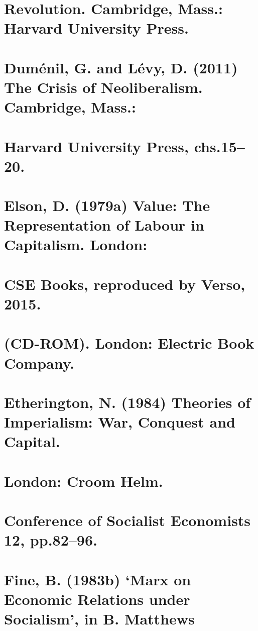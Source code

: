 \section{Revolution. Cambridge, Mass.: Harvard University Press.}


\section{Duménil, G. and Lévy, D. (2011) The Crisis of Neoliberalism. Cambridge, Mass.:}


\section{Harvard University Press, chs.15–20.}


\section{Elson, D. (1979a) Value: The Representation of Labour in Capitalism. London:}


\section{CSE Books, reproduced by Verso, 2015.}


\section{(CD-ROM). London: Electric Book Company.}


\section{Etherington, N. (1984) Theories of Imperialism: War, Conquest and Capital.}


\section{London: Croom Helm.}


\section{Conference of Socialist Economists 12, pp.82–96.}


\section{Fine, B. (1983b) ‘Marx on Economic Relations under Socialism’, in B. Matthews}


